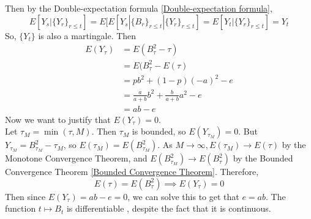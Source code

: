 \documentclass[11pt]{article}
\begin{document}
    Then by the Double-expectation formula \ref{Double-expectation formula},
    $$E[Y_s |\{Y_r\}_{r\leq t}] = E[E[Y_s | \{B_r\}_{r\leq t}|\{Y_r\}_{r\leq t}] = E[Y_t | \{Y_r\}_{r\leq t}] = Y_t$$
    So, $\{Y_t\}$ is also a martingale. Then
    \begin{align*}
    	E(Y_{\tau}) &= E(B_{\tau}^2 - \tau) \\
    	&= E(B_{\tau}^2 - E(\tau) \\
    	&= pb^2 + (1-p)(-a)^2 -e \\
    	&= \frac{a}{a+b}b^2 + \frac{b}{a+b}a^2 - e\\
    	&= ab - e
    \end{align*}
   	Now we want to justify that $E(Y_\tau) = 0$.\\
   	Let $\tau_M = \min(\tau, M)$. Then $\tau_M$ is bounded, so $E(Y_{\tau_M}) = 0$. But $Y_{\tau_M} = B_{\tau_M}^2 - \tau_M$, so $E(\tau_M) = E(B_{\tau_M}^2)$. As $M \rightarrow \infty, E(\tau_M) \rightarrow E(\tau)$ by the Monotone Convergence Theorem, and $E(B_{\tau_M}^2) \rightarrow E(B_\tau^2)$ by the Bounded Convergence Theorem \ref{Bounded Convergence Theorem}. Therefore, 
   	$$E(\tau) = E(B^2_\tau) \implies E(Y_\tau) = 0$$
   	Then since $E(Y_{\tau}) = ab - e = 0$, we can solve this to get that $e = ab$.
   	\fact The function $t \mapsto B_t$ is differentiable , despite the fact that it is continuous.
\end{document}
